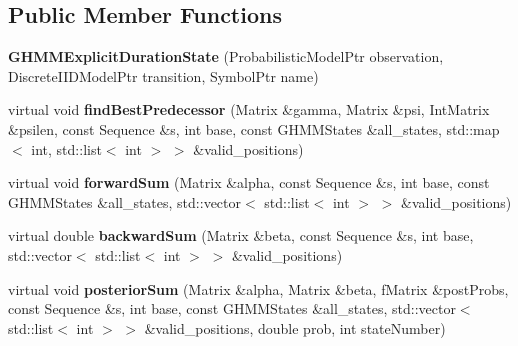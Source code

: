 \subsection*{Public Member Functions}
\begin{DoxyCompactItemize}
\item 
\mbox{\label{classtops_1_1GHMMExplicitDurationState_acaaab69ef474200c02382e57b8bdb3d4}} 
{\bfseries G\+H\+M\+M\+Explicit\+Duration\+State} (Probabilistic\+Model\+Ptr observation, Discrete\+I\+I\+D\+Model\+Ptr transition, Symbol\+Ptr name)
\item 
\mbox{\label{classtops_1_1GHMMExplicitDurationState_a0da2aed9eb61e299dae400081b9f9a7e}} 
virtual void {\bfseries find\+Best\+Predecessor} (Matrix \&gamma, Matrix \&psi, Int\+Matrix \&psilen, const Sequence \&s, int base, const G\+H\+M\+M\+States \&all\+\_\+states, std\+::map$<$ int, std\+::list$<$ int $>$ $>$ \&valid\+\_\+positions)
\item 
\mbox{\label{classtops_1_1GHMMExplicitDurationState_a4a14544406eaf4f67715831954351fee}} 
virtual void {\bfseries forward\+Sum} (Matrix \&alpha, const Sequence \&s, int base, const G\+H\+M\+M\+States \&all\+\_\+states, std\+::vector$<$ std\+::list$<$ int $>$ $>$ \&valid\+\_\+positions)
\item 
\mbox{\label{classtops_1_1GHMMExplicitDurationState_add57b92313e42bbaa2e95554a695d4f4}} 
virtual double {\bfseries backward\+Sum} (Matrix \&beta, const Sequence \&s, int base, std\+::vector$<$ std\+::list$<$ int $>$ $>$ \&valid\+\_\+positions)
\item 
\mbox{\label{classtops_1_1GHMMExplicitDurationState_ae8c44fa2d21d3846feb7aac7186f9192}} 
virtual void {\bfseries posterior\+Sum} (Matrix \&alpha, Matrix \&beta, f\+Matrix \&post\+Probs, const Sequence \&s, int base, const G\+H\+M\+M\+States \&all\+\_\+states, std\+::vector$<$ std\+::list$<$ int $>$ $>$ \&valid\+\_\+positions, double prob, int state\+Number)
\item 
\mbox{\label{classtops_1_1GHMMExplicitDurationState_a04add3cac332dde621b22acd44a42507}} 

\end{DoxyCompactItemize}
